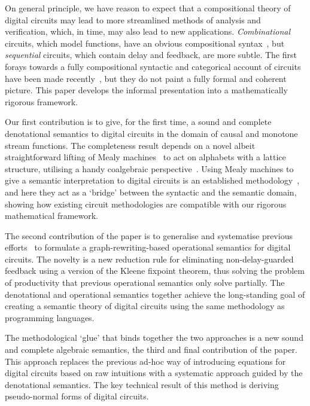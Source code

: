 \documentclass{lmcs}
\begin{document}
On general principle, we have reason to expect that a compositional theory of
digital circuits may lead to more streamlined methods of analysis and
verification, which, in time, may also lead to new applications.
\emph{Combinational} circuits, which model functions, have an obvious
compositional syntax~\cite{lafont2003algebraic}, but \emph{sequential} circuits,
which contain delay and feedback, are more subtle.
The first forays towards a fully compositional syntactic and
categorical account of circuits have been made
recently~\cite{ghica2016categorical,ghica2017diagrammatic}, but they do not
paint a fully formal and coherent picture.
This paper develops the informal presentation into a mathematically
rigorous framework.

Our first contribution is to give, for the first time, a sound and complete
denotational semantics to digital circuits in the domain of causal and monotone
stream functions.
The completeness result depends on a novel albeit straightforward lifting of
Mealy machines~\cite{mealy1955method} to act on alphabets with a lattice
structure, utilising a handy coalgebraic perspective~\cite{rutten2006algebraic}.
Using Mealy machines to give a semantic interpretation to digital circuits is an
established methodology~\cite{kohavi2009switching}, and here they act as a
`bridge' between the syntactic and the semantic domain, showing how existing
circuit methodologies are compatible with our rigorous mathematical framework.

The second contribution of the paper is to generalise and systematise previous
efforts~\cite{ghica2017diagrammatic} to formulate a graph-rewriting-based
operational semantics for digital circuits.
The novelty is a new reduction rule for eliminating non-delay-guarded feedback
using a version of the Kleene fixpoint theorem, thus solving the problem of
productivity that previous operational semantics only solve partially.
The denotational and operational semantics together achieve the long-standing
goal of creating a semantic theory of digital circuits using the same
methodology as programming languages.

The methodological `glue' that binds together the two approaches is a new sound
and complete algebraic semantics, the third and final contribution of the paper.
This approach replaces the previous ad-hoc way of introducing equations for
digital circuits based on raw intuitions with a systematic approach guided by
the denotational semantics.
The key technical result of this method is deriving pseudo-normal forms of
digital circuits.
\end{document}

